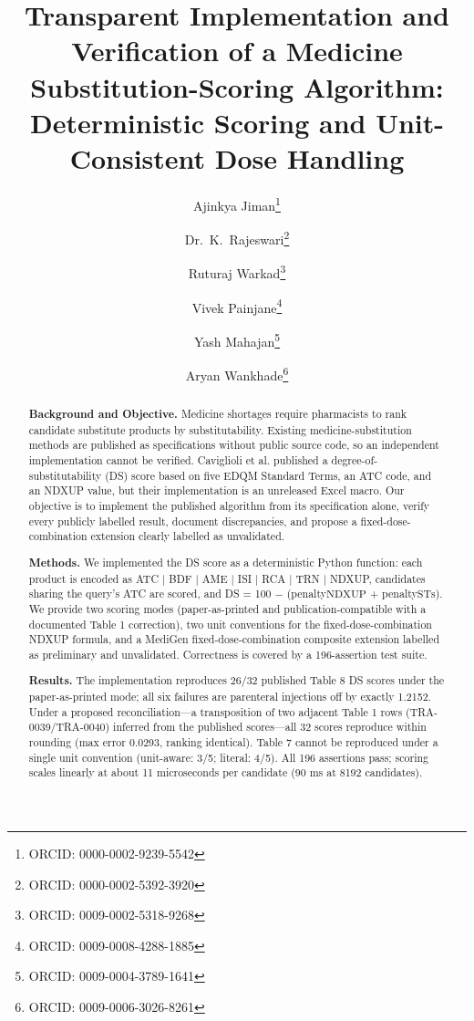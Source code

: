 \documentclass[twocolumn,a4paper]{elsarticle}
\begin{document}
\begin{frontmatter}

\title{Transparent Implementation and Verification of a Medicine Substitution-Scoring Algorithm:\\Deterministic Scoring and Unit-Consistent Dose Handling}

\author[1]{Ajinkya Jiman\footnote{ORCID: 0000-0002-9239-5542}}
\author[1]{Dr.~K.~Rajeswari\footnote{ORCID: 0000-0002-5392-3920}}
\author[1]{Ruturaj Warkad\footnote{ORCID: 0009-0002-5318-9268}}
\author[1]{Vivek Painjane\footnote{ORCID: 0009-0008-4288-1885}}
\author[1]{Yash Mahajan\footnote{ORCID: 0009-0004-3789-1641}}
\author[1]{Aryan Wankhade\footnote{ORCID: 0009-0006-3026-8261}}



\begin{abstract}
\textbf{Background and Objective.} Medicine shortages require pharmacists to rank candidate substitute products by substitutability. Existing medicine-substitution methods are published as specifications without public source code, so an independent implementation cannot be verified. Caviglioli et al. published a degree-of-substitutability (DS) score based on five EDQM Standard Terms, an ATC code, and an NDXUP value, but their implementation is an unreleased Excel macro. Our objective is to implement the published algorithm from its specification alone, verify every publicly labelled result, document discrepancies, and propose a fixed-dose-combination extension clearly labelled as unvalidated.

\textbf{Methods.} We implemented the DS score as a deterministic Python function: each product is encoded as ATC | BDF | AME | ISI | RCA | TRN | NDXUP, candidates sharing the query's ATC are scored, and DS = 100 $-$ (penalty$\text{NDXUP}$ + penalty$\text{STs}$). We provide two scoring modes (paper-as-printed and publication-compatible with a documented Table 1 correction), two unit conventions for the fixed-dose-combination NDXUP formula, and a MediGen fixed-dose-combination composite extension labelled as preliminary and unvalidated. Correctness is covered by a 196-assertion test suite.

\textbf{Results.} The implementation reproduces 26/32 published Table 8 DS scores under the paper-as-printed mode; all six failures are parenteral injections off by exactly 1.2152. Under a proposed reconciliation---a transposition of two adjacent Table 1 rows (TRA-0039/TRA-0040) inferred from the published scores---all 32 scores reproduce within rounding (max error 0.0293, ranking identical). Table 7 cannot be reproduced under a single unit convention (unit-aware: 3/5; literal: 4/5). All 196 assertions pass; scoring scales linearly at about 11 microseconds per candidate (90 ms at 8192 candidates).


\end{abstract}
\end{frontmatter}
\end{document}
